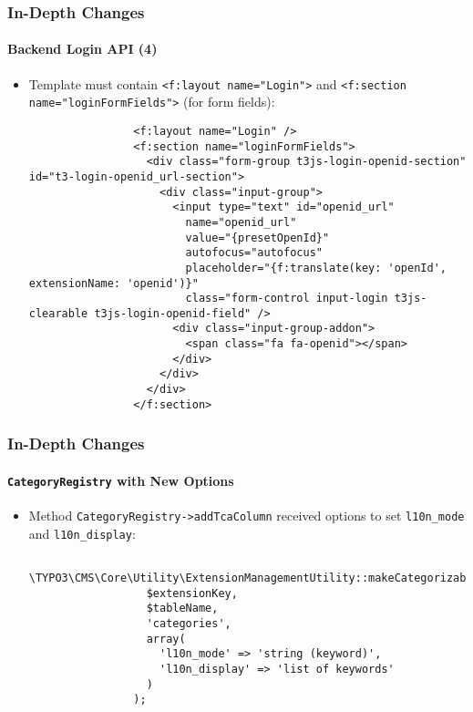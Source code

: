 \begin{frame}[fragile]
	\frametitle{In-Depth Changes}
	\framesubtitle{Backend Login API (4)}

	\lstset{basicstyle=\tiny\ttfamily}

	\begin{itemize}

		\item Template must contain \texttt{<f:layout name="Login">} and
			\texttt{<f:section name="loginFormFields">} (for form fields):

			\begin{lstlisting}
				<f:layout name="Login" />
				<f:section name="loginFormFields">
				  <div class="form-group t3js-login-openid-section" id="t3-login-openid_url-section">
				    <div class="input-group">
				      <input type="text" id="openid_url"
				        name="openid_url"
				        value="{presetOpenId}"
				        autofocus="autofocus"
				        placeholder="{f:translate(key: 'openId', extensionName: 'openid')}"
				        class="form-control input-login t3js-clearable t3js-login-openid-field" />
				      <div class="input-group-addon">
				        <span class="fa fa-openid"></span>
				      </div>
				    </div>
				  </div>
				</f:section>
			\end{lstlisting}

	\end{itemize}

\end{frame}


\begin{frame}[fragile]
	\frametitle{In-Depth Changes}
	\framesubtitle{\texttt{CategoryRegistry} with New Options}

	\lstset{basicstyle=\tiny\ttfamily}

	\begin{itemize}

		\item Method \texttt{CategoryRegistry->addTcaColumn} received options to set
			\texttt{l10n\_mode} and \texttt{l10n\_display}:

			\begin{lstlisting}
				\TYPO3\CMS\Core\Utility\ExtensionManagementUtility::makeCategorizable(
				  $extensionKey,
				  $tableName,
				  'categories',
				  array(
				    'l10n_mode' => 'string (keyword)',
				    'l10n_display' => 'list of keywords'
				  )
				);
			\end{lstlisting}

	\end{itemize}

\end{frame}

